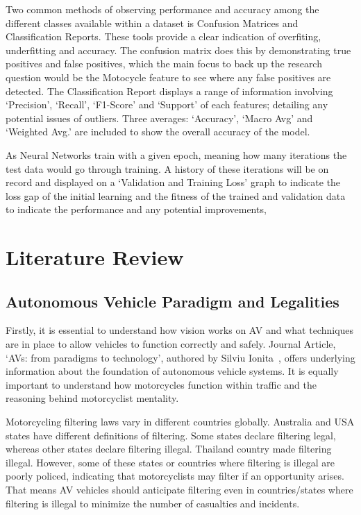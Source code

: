 \documentclass[12pt]{report} %
\begin{document}
        Two common methods of observing performance and accuracy among the different classes available within a dataset is Confusion Matrices and Classification Reports. These tools provide a clear indication of overfiting, underfitting and accuracy. The confusion matrix does this by demonstrating true positives and false positives, which the main focus to back up the research question would be the Motocycle feature to see where any false positives are detected. The Classification Report displays a range of information involving `Precision', `Recall', `F1-Score' and `Support' of each features; detailing any potential issues of outliers. Three averages: `Accuracy', `Macro Avg' and `Weighted Avg.' are included to show the overall accuracy of the model.~\cite{liang_confusion_2022}~\cite{panigrahi_deep_2018}

        As Neural Networks train with a given epoch, meaning how many iterations the test data would go through training. A history of these iterations will be on record and displayed on a `Validation and Training Loss' graph to indicate the loss gap of the initial learning and the fitness of the trained and validation data to indicate the performance and any potential improvements,~\cite{panigrahi_deep_2018}

\chapter{Literature Review}
\label{chap:literatureReview}
	\section{Autonomous Vehicle Paradigm and Legalities}
		Firstly, it is essential to understand how vision works on AV and what techniques are in place to allow vehicles to function correctly and safely. Journal Article, `AVs: from paradigms to technology', authored by Silviu Ionita~\cite{ionita_autonomous_2017}, offers underlying information about the foundation of autonomous vehicle systems. It is equally important to understand how motorcycles function within traffic and the reasoning behind motorcyclist mentality.

		Motorcycling filtering laws vary in different countries globally. Australia and USA states have different definitions of filtering. Some states declare filtering legal, whereas other states declare filtering illegal. Thailand country made filtering illegal. However, some of these states or countries where filtering is illegal are poorly policed, indicating that motorcyclists may filter if an opportunity arises. That means AV vehicles should anticipate filtering even in countries/states where filtering is illegal to minimize the number of casualties and incidents.~\cite{promraksa_lane-filtering_2022}
\end{document}

